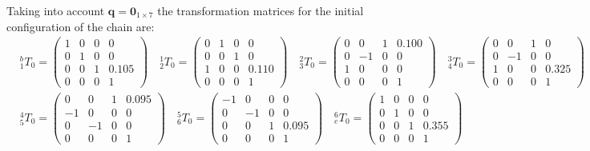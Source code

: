 Taking into account $\mathbf{q} = \mathbf{0}_{1 \times 7}$ the transformation matrices for the initial configuration of the chain are:
\begin{align*}
	&^b_1 T_0 = \begin{pmatrix}
		1 & 0 & 0 & 0 \\
0      & 1 & 0 & 0 \\
0      & 0 & 1 & 0.105 \\
0      & 0 & 0 & 1
	\end{pmatrix} \quad
	^1_2 T_0 = \begin{pmatrix}
		0 & 1 & 0 & 0 \\
		0 & 0 & 1 & 0 \\
		1 & 0 & 0 & 0.110 \\
		0 & 0 & 0 & 1
	\end{pmatrix} \quad
	^2_3 T_0 = \begin{pmatrix}
		0 & 0 & 1 & 0.100 \\
		0 & -1 & 0 & 0 \\
		1 & 0 & 0 & 0 \\
		0 & 0 & 0 & 1
	\end{pmatrix} \quad
	^3_4 T_0 = \begin{pmatrix}
		0 & 0 & 1 & 0 \\
		0 & -1 & 0 & 0 \\
		1 & 0 & 0 & 0.325 \\
		0 & 0 & 0 & 1
	\end{pmatrix}
	\\
	&^4_5 T_0 = \begin{pmatrix}
		0 & 0 & 1 & 0.095 \\
		-1 & 0 & 0 & 0\\
		0 & -1 & 0 & 0\\
		0 & 0 & 0 & 1
	\end{pmatrix} \quad
	^5_6 T_0 = \begin{pmatrix}
		-1 & 0 & 0 & 0 \\
		0 & -1 & 0 & 0 \\
		0 & 0 & 1 & 0.095 \\
		0 & 0 & 0 & 1
	\end{pmatrix} \quad
	^6_e T_0 = \begin{pmatrix}
		1 & 0 & 0 & 0 \\
		0 & 1 & 0 & 0 \\
		0 & 0 & 1 & 0.355 \\
		0 & 0 & 0 & 1
	\end{pmatrix}
\end{align*}

